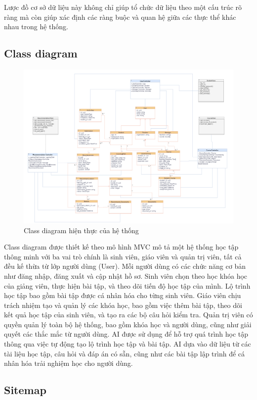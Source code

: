 Lược đồ cơ sở dữ liệu này không chỉ giúp tổ chức dữ liệu theo một cấu trúc rõ ràng mà còn giúp xác định các ràng buộc và quan hệ giữa các thực thể khác nhau trong hệ thống.
\newpage
\subsection{Class diagram}
\begin{figure}[h!]
    \centering
    \includegraphics[width=\linewidth]{Images/Anh/classdiagram.png}
    \caption{Class diagram hiện thực của hệ thống}
    \label{fig:enter-label}
\end{figure}
Class diagram được thiết kế theo mô hình MVC mô tả một hệ thống học tập thông minh với ba vai trò chính là sinh viên, giáo viên và quản trị viên, tất cả đều kế thừa từ lớp người dùng (User). Mỗi người dùng có các chức năng cơ bản như đăng nhập, đăng xuất và cập nhật hồ sơ. Sinh viên chọn theo học khóa học của giảng viên, thực hiện bài tập, và theo dõi tiến độ học tập của mình. Lộ trình học tập bao gồm bài tập được cá nhân hóa cho từng sinh viên. Giáo viên chịu trách nhiệm tạo và quản lý các khóa học, bao gồm việc thêm bài tập, theo dõi kết quả học tập của sinh viên, và tạo ra các bộ câu hỏi kiểm tra. Quản trị viên có quyền quản lý toàn bộ hệ thống, bao gồm khóa học và người dùng, cũng như giải quyết các thắc mắc từ người dùng.
AI được sử dụng để hỗ trợ quá trình học tập thông qua việc tự động tạo lộ trình học tập và bài tập. AI dựa vào dữ liệu từ các tài liệu học tập, câu hỏi và đáp án có sẵn, cũng như các bài tập lập trình để cá nhân hóa trải nghiệm học cho người dùng.
\subsection{Sitemap}
